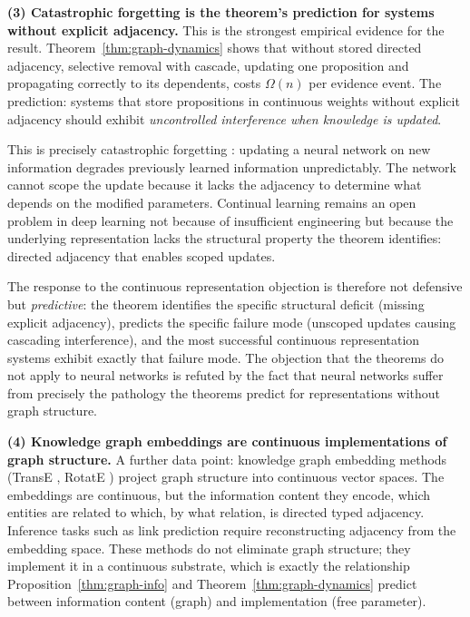 \documentclass[11pt]{article}
\theoremstyle{definition}
\begin{document}
\textbf{(3) Catastrophic forgetting is the theorem's prediction for
systems without explicit adjacency.}
This is the strongest empirical evidence for the result.
Theorem~\ref{thm:graph-dynamics} shows that without stored directed
adjacency, selective removal with cascade, updating one proposition
and propagating correctly to its dependents, costs $\Omega(n)$ per
evidence event. The prediction: systems that store propositions in
continuous weights without explicit adjacency should exhibit
\emph{uncontrolled interference when knowledge is updated}.

This is precisely catastrophic forgetting
\cite{McCloskey1989,Kirkpatrick2017}: updating a neural network on new
information degrades previously learned information unpredictably.
The network cannot scope the update because it lacks the adjacency
to determine what depends on the modified parameters. Continual
learning remains an open problem in deep learning not because of
insufficient engineering but because the underlying representation
lacks the structural property the theorem identifies: directed
adjacency that enables scoped updates.

The response to the continuous representation objection is therefore
not defensive but \emph{predictive}: the theorem identifies the specific
structural deficit (missing explicit adjacency), predicts the specific
failure mode (unscoped updates causing cascading interference), and the
most successful continuous representation systems exhibit exactly that
failure mode. The objection that the theorems do not apply to neural
networks is refuted by the fact that neural networks suffer from
precisely the pathology the theorems predict for representations
without graph structure.

\textbf{(4) Knowledge graph embeddings are continuous implementations
of graph structure.}
A further data point: knowledge graph embedding methods (TransE
\cite{Bordes2013}, RotatE \cite{Sun2019}) project graph structure into
continuous vector spaces. The embeddings are continuous, but the
information content they encode, which entities are related to which,
by what relation, is directed typed adjacency. Inference tasks such
as link prediction require reconstructing adjacency from the embedding
space. These methods do not eliminate graph structure; they implement it
in a continuous substrate, which is exactly the relationship
Proposition~\ref{thm:graph-info} and Theorem~\ref{thm:graph-dynamics} predict between
information content (graph) and implementation (free parameter).
\end{document}
